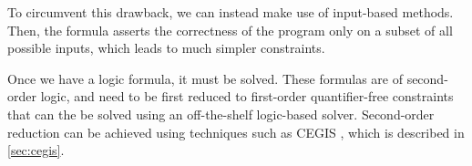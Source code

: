 To circumvent this drawback, we can instead make use of input-based methods. Then, the formula asserts the correctness of the program only on a subset of all possible inputs, which leads to much simpler constraints.

Once we have a logic formula, it must be solved. These formulas are of second-order logic, and need to be first reduced to first-order quantifier-free constraints that can the be solved using an off-the-shelf logic-based solver. Second-order reduction can be achieved using techniques such as \ac{CEGIS} \cite{Solar-LezamaPhDThesis}, which is described in \autoref{sec:cegis}.

